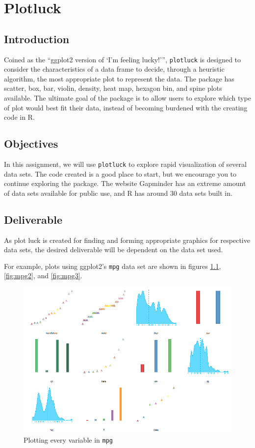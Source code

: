 \chapter{Plotluck}
\section{Introduction}
Coined as the ``ggplot2 version of `I'm feeling lucky!''', \texttt{plotluck} is designed to consider the characteristics of a data frame to decide, through a heuristic algorithm, the most appropriate plot to represent the data.
The package has scatter, box, bar, violin, density, heat map, hexagon bin, and spine plots available.
The ultimate goal of the package is to allow users to explore which type of plot would best fit their data, instead of becoming burdened with the creating code in R.

\section{Objectives}
In this assignment, we will use \texttt{plotluck} to explore rapid visualization of several data sets.
The code created is a good place to start, but we encourage you to continue exploring the package.
The website Gapminder has an extreme amount of data sets available for public use, and R has around 30 data sets built in.

\section{Deliverable}
As plot luck is created for finding and forming appropriate graphics for respective data sets, the desired deliverable will be dependent on the data set used.

For example, plots using ggplot2's \texttt{mpg} data set are shown in figures \ref{fig:mpg1}, \ref{fig:mpg2}, and \ref{fig:mpg3}.

\begin{figure}[htbp!]
    \centering
    \includegraphics[width=.5\textwidth]{pictures/plotluck/mpgall}
    \caption{Plotting every variable in \texttt{mpg}}
    \label{fig:mpg1}
\end{figure}


